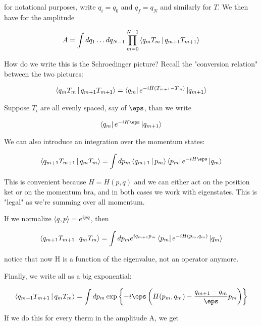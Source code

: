 \documentclass{report}
\begin{document}
for notational purposes, write \(q_i = q_0\) and \(q_f = q_N\) and similarly for \(T\). We then have for the amplitude 

\begin{align}
    A = \int dq_1 \ldots dq_{N-1}\prod_{m=0}^{N-1} \Braket{q_m T_m | q_{m+1} T_{m+1}}
\end{align}

How do we write this is the Schroedinger picture? Recall the "conversion relation" between the two pictures: 

\begin{align}
    \Braket{q_m T_m  | q_{m+1} T_{m+1}} = \bra{q_m} e^{-iH (T_{m+1} - T_m)}\ket{q_{m+1}}
\end{align}

Suppose \(T_i\) are all evenly spaced, say of \(\eps\), than we write 

\begin{align}
    \bra{q_m}e^{-iH\eps}\ket{q_{m+1}} 
\end{align}

We can also introduce an integration over the momentum states: 

\begin{align}
    \Braket{q_{m+1} T_{m+1} | q_{m} T_{m}} = \int dp_m \Braket{q_{m+1} | p_m} \bra{p_m}e^{-iH\eps}\ket{q_{m}}
\end{align}

This is convenient because \(H = H(p, q)\) and we can either act on the position ket or on the momentum bra, and in both cases we work with eigenstates. This is "legal" as we're summing over all momentum. 

If we normalize \(\Braket{q, p} = e^{ipq}\), then 

\begin{align}
    \Braket{q_{m+1} T_{m+1} | q_{m} T_{m}} = \int dp_m e^{iq_{m+1}p_m}\bra{p_m}e^{-iH(p_m, q_m)}\ket{q_m}
\end{align}

notice that now H is a function of the eigenvalue, not an operator anymore. 

Finally, we write all as a big exponential:  

\begin{align}
    \Braket{q_{m+1} T_{m+1} | q_{m} T_{m}} = \int dp_m \exp\left\{-i\eps\left(H(p_m, q_m) - \frac{q_{m+1}-q_m}{\eps}p_m\right)\right\}
\end{align}

If we do this for every therm in the amplitude A, we get 
\end{document}
